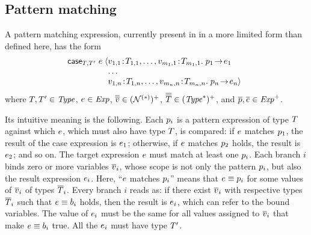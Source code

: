 
\subsection{Pattern matching}

A pattern matching expression, currently present in \cite{lm} in a more
limited form than defined here, has the form
\[
\caseFTL{\typ}{\typ'}{\expr}
        {\casebrFT{\var_{1,1}}{\typ_{1,1}}{\var_{m_1,1}}{\typ_{m_1,1}}
                  {\pexpr_1}{\expr_1}}
        {\casebrFT{\var_{1,n}}{\typ_{1,n}}{\var_{m_n,n}}{\typ_{m_n,n}}
                  {\pexpr_n}{\expr_n}}
\]
where $T,T'\in\mathit{Type}$, $e\in\mathit{Exp}$,
$\overline{\overline{v}}\in(\mathcal{N}^{(\ast)})^+$, $\overline{\overline{T}}\in(\mathit{Type}^\ast)^+$,
and $\overline{p},\overline{e}\in\mathit{Exp}^+$.

Its intuitive meaning is the following. Each $p_i$ is a pattern
expression of type $T$ against which $e$, which must also have type
$T$, is compared: if $e$ matches $p_1$, the result of the case
expression is $e_1$; otherwise, if $e$ matches $p_2$ holds, the
result is $e_2$; and so on. The target expression $e$ must match at
least one $p_i$. Each branch $i$ binds zero or more variables $\overline{v}_i$,
whose scope is not only the pattern $p_i$, but also the result expression
$e_i$. Here, ``$e$ matches $p_i$'' means that
$e\equiv p_i$ for some values of $\overline{v}_i$ of types $\overline{T}_i$.  Every
branch $i$ reads as: if there exist $\overline{v}_i$ with respective types $\overline{T}_i$
such that $e\equiv b_i$ holds, then the result is $e_i$, which
can refer to the bound variables. The value of $e_i$ must be the same for
all values assigned to $\overline{v}_i$ that make $e\equiv b_i$ true. All
the $e_i$ must have type $T'$.

